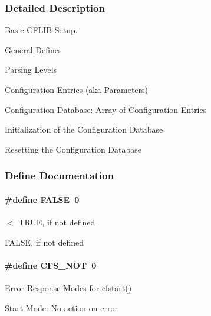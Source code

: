 \subsubsection{Detailed Description}
Basic C\-F\-L\-I\-B Setup. 
\begin{DoxyItemize}
\item General Defines
\item Parsing Levels
\item Configuration Entries (aka Parameters)
\item Configuration Database\-: Array of Configuration Entries
\item Initialization of the Configuration Database
\item Resetting the Configuration Database 
\end{DoxyItemize}

\subsubsection{Define Documentation}
\hypertarget{group__cflib__core_gaa93f0eb578d23995850d61f7d61c55c1}{
\paragraph[{F\-A\-L\-S\-E}]{\setlength{\rightskip}{0pt plus 5cm}\#define {\bf F\-A\-L\-S\-E}~0}}\label{group__cflib__core_gaa93f0eb578d23995850d61f7d61c55c1}


$<$ T\-R\-U\-E, if not defined 

F\-A\-L\-S\-E, if not defined \hypertarget{group__cflib__core_gaf363125c0f5c520d748d8d0ecaf1af01}{
\paragraph[{C\-F\-S\-\_\-\-N\-O\-T}]{\setlength{\rightskip}{0pt plus 5cm}\#define {\bf C\-F\-S\-\_\-\-N\-O\-T}~0}}\label{group__cflib__core_gaf363125c0f5c520d748d8d0ecaf1af01}


Error Response Modes for \hyperlink{group__cflib__core_ga6e04a462f9ad273de914af386ff15623}{cfstart()} 

Start Mode\-: No action on error 

